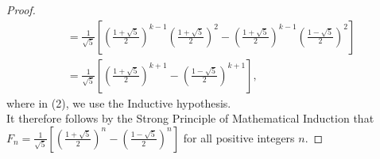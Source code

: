 \documentclass[11pt]{article}
\begin{document}
\begin{proof}
\begin{align}
		&= \frac{1}{\sqrt{5}}\left[\left(\frac{1+\sqrt{5}}{2}\right)^{k-1}\left(\frac{1+\sqrt{5}}{2}\right)^2 - \left(\frac{1+\sqrt{5}}{2}\right)^{k-1}\left(\frac{1-\sqrt{5}}{2}\right)^2\right] \\
		&= \frac{1}{\sqrt{5}}\left[\left(\frac{1+\sqrt{5}}{2}\right)^{k+1}-\left(\frac{1-\sqrt{5}}{2}\right)^{k+1}\right],
	\end{align}
	where in (2), we use the Inductive hypothesis. \\
	It therefore follows by the Strong Principle of Mathematical Induction that $F_n=\frac{1}{\sqrt{5}}\left[\left(\frac{1+\sqrt{5}}{2}\right)^n-\left(\frac{1-\sqrt{5}}{2}\right)^n\right]$ for all positive integers $n$.
\end{proof}
\end{document}
